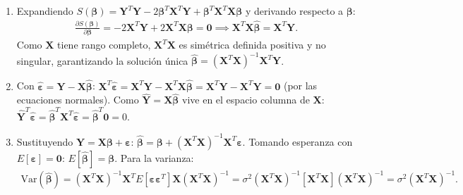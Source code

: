 \begin{solproblema}
	\begin{enumerate}
		\item Expandiendo $S(\boldsymbol{\beta}) = \mathbf{Y}^T\mathbf{Y} - 2\boldsymbol{\beta}^T\mathbf{X}^T\mathbf{Y} + \boldsymbol{\beta}^T\mathbf{X}^T\mathbf{X}\boldsymbol{\beta}$ y derivando respecto a $\boldsymbol{\beta}$:
		\begin{align}
			\frac{\partial S(\boldsymbol{\beta})}{\partial\boldsymbol{\beta}} = -2\mathbf{X}^T\mathbf{Y}+2\mathbf{X}^T\mathbf{X}\boldsymbol{\beta} = \mathbf{0} \implies \mathbf{X}^T\mathbf{X}\hat{\boldsymbol{\beta}} = \mathbf{X}^T\mathbf{Y}.
		\end{align}
		Como $\mathbf{X}$ tiene rango completo, $\mathbf{X}^T\mathbf{X}$ es simétrica definida positiva y no singular, garantizando la solución única $\hat{\boldsymbol{\beta}} = (\mathbf{X}^T\mathbf{X})^{-1}\mathbf{X}^T\mathbf{Y}$.
		\item Con $\hat{\boldsymbol{\varepsilon}} = \mathbf{Y}-\mathbf{X}\hat{\boldsymbol{\beta}}$: $\mathbf{X}^T\hat{\boldsymbol{\varepsilon}} = \mathbf{X}^T\mathbf{Y}-\mathbf{X}^T\mathbf{X}\hat{\boldsymbol{\beta}} = \mathbf{X}^T\mathbf{Y}-\mathbf{X}^T\mathbf{Y} = \mathbf{0}$ (por las ecuaciones normales). Como $\hat{\mathbf{Y}}=\mathbf{X}\hat{\boldsymbol{\beta}}$ vive en el espacio columna de $\mathbf{X}$: $\hat{\mathbf{Y}}^T\hat{\boldsymbol{\varepsilon}} = \hat{\boldsymbol{\beta}}^T\mathbf{X}^T\hat{\boldsymbol{\varepsilon}} = \hat{\boldsymbol{\beta}}^T\mathbf{0} = 0$.
		\item Sustituyendo $\mathbf{Y}=\mathbf{X}\boldsymbol{\beta}+\boldsymbol{\varepsilon}$: $\hat{\boldsymbol{\beta}} = \boldsymbol{\beta}+(\mathbf{X}^T\mathbf{X})^{-1}\mathbf{X}^T\boldsymbol{\varepsilon}$. Tomando esperanza con $E[\boldsymbol{\varepsilon}]=\mathbf{0}$: $E[\hat{\boldsymbol{\beta}}]=\boldsymbol{\beta}$. Para la varianza:
		\begin{align}
			\text{Var}(\hat{\boldsymbol{\beta}}) = (\mathbf{X}^T\mathbf{X})^{-1}\mathbf{X}^T E[\boldsymbol{\varepsilon}\boldsymbol{\varepsilon}^T]\mathbf{X}(\mathbf{X}^T\mathbf{X})^{-1} = \sigma^2(\mathbf{X}^T\mathbf{X})^{-1}[\mathbf{X}^T\mathbf{X}](\mathbf{X}^T\mathbf{X})^{-1} = \sigma^2(\mathbf{X}^T\mathbf{X})^{-1}.
		\end{align}
	\end{enumerate}
\end{solproblema}

